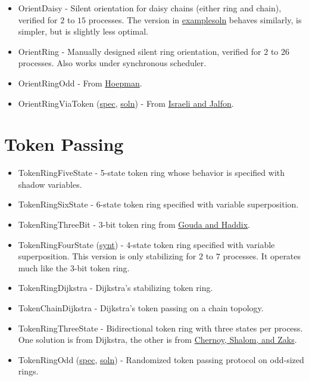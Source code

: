 \begin{itemize}
\item OrientDaisy \href{example/Orientation.html#sec:OrientDaisy}{\LinkText}
- Silent orientation for daisy chains (either ring and chain), verified for $2$ to $15$ processes.
The version in \href{\examplesoln}{examplesoln} behaves similarly, is simpler, but is slightly less optimal.
\item OrientRing \href{example/Orientation.html#sec:OrientRing}{\LinkText}
- Manually designed silent ring orientation, verified for $2$ to $26$ processes.
Also works under synchronous scheduler.
\item OrientRingOdd \href{example/Orientation.html#sec:OrientRingOdd}{\LinkText}
- From \href{http://dx.doi.org/10.1007/BFb0020439}{Hoepman}.
\item OrientRingViaToken (\href{\examplespec/OrientRingViaToken.prot}{spec}, \href{\examplesoln/OrientRingViaToken.prot}{soln})
- From \href{http://dx.doi.org/10.1006/inco.1993.1029}{Israeli and Jalfon}.
\end{itemize}

\section{Token Passing}

\begin{itemize}
\item TokenRingFiveState \href{example/TokenPassing.html#sec:TokenRingFiveState}{\LinkText}
- 5-state token ring whose behavior is specified with shadow variables.
\item TokenRingSixState \href{example/TokenPassing.html#sec:TokenRingSixState}{\LinkText}
- 6-state token ring specified with variable superposition.
\item TokenRingThreeBit \href{example/TokenPassing.html#sec:TokenRingThreeBit}{\LinkText}
- 3-bit token ring from \href{http://dx.doi.org/10.1006/jpdc.1996.0066}{Gouda and Haddix}.
\item TokenRingFourState (\href{\examplesynt/TokenRingFourState.prot}{synt})
- 4-state token ring specified with variable superposition.
This version is only stabilizing for $2$ to $7$ processes.
It operates much like the 3-bit token ring.
\item TokenRingDijkstra \href{example/TokenPassing.html#sec:TokenRingDijkstra}{\LinkText}
- Dijkstra's stabilizing token ring.
\item TokenChainDijkstra \href{example/TokenPassing.html#sec:TokenChainDijkstra}{\LinkText}
- Dijkstra's token passing on a chain topology.
\item TokenRingThreeState \href{example/TokenPassing.html#sec:TokenRingThreeState}{\LinkText}
- Bidirectional token ring with three states per process.
One solution is from Dijkstra, the other is from \href{http://citeseerx.ist.psu.edu/viewdoc/summary?doi=10.1.1.153.6017}{Chernoy, Shalom, and Zaks}.
\item TokenRingOdd (\href{\examplespec/TokenRingOdd.prot}{spec}, \href{\examplesoln/TokenRingOdd.prot}{soln})
- Randomized token passing protocol on odd-sized rings.
\end{itemize}

